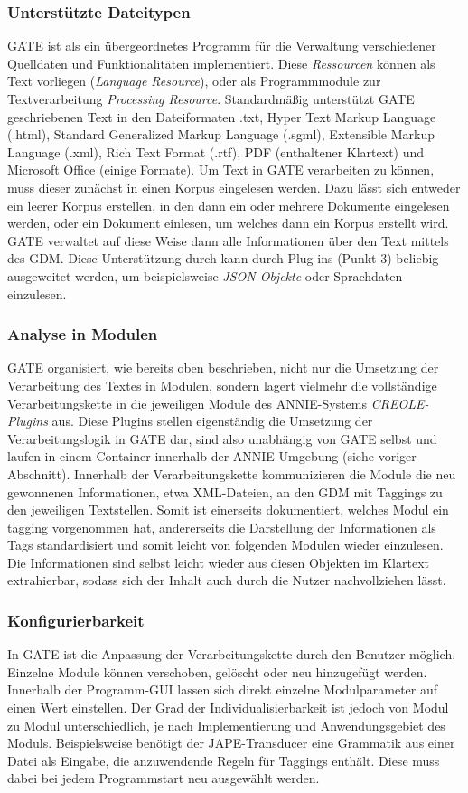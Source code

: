 \documentclass[12pt]{report}
\begin{document}
\subsubsection{Unterstützte Dateitypen}
GATE ist als ein übergeordnetes Programm für die Verwaltung verschiedener Quelldaten und Funktionalitäten implementiert. Diese \textit{Ressourcen} können als Text vorliegen (\textit{Language Resource}), oder als Programmmodule zur Textverarbeitung \textit{Processing Resource}. Standardmäßig unterstützt GATE geschriebenen Text in den Dateiformaten .txt, Hyper Text Markup Language (.html), Standard Generalized Markup Language (.sgml), Extensible Markup Language (.xml), Rich Text Format (.rtf), PDF (enthaltener Klartext) und Microsoft Office (einige Formate). Um Text in GATE verarbeiten zu können, muss dieser zunächst in einen Korpus eingelesen werden. Dazu lässt sich entweder ein leerer Korpus erstellen, in den dann ein oder mehrere Dokumente eingelesen werden, oder ein Dokument einlesen, um welches dann ein Korpus erstellt wird. GATE verwaltet auf diese Weise dann alle Informationen über den Text mittels des GDM. Diese Unterstützung durch kann durch Plug-ins (Punkt 3) beliebig ausgeweitet werden, um beispielsweise \textit{JSON-Objekte} oder Sprachdaten einzulesen.

\subsubsection{Analyse in Modulen}
GATE organisiert, wie bereits oben beschrieben, nicht nur die Umsetzung der Verarbeitung des Textes in Modulen, sondern lagert vielmehr die vollständige Verarbeitungskette in die jeweiligen Module des ANNIE-Systems \textit{CREOLE-Plugins} aus. Diese Plugins stellen eigenständig die Umsetzung der Verarbeitungslogik in GATE dar, sind also unabhängig von GATE selbst und laufen in einem Container innerhalb der ANNIE-Umgebung (siehe voriger Abschnitt). Innerhalb der Verarbeitungskette kommunizieren die Module die neu gewonnenen Informationen, etwa XML-Dateien, an den GDM mit Taggings zu den jeweiligen Textstellen. Somit ist einerseits dokumentiert, welches Modul ein tagging vorgenommen hat,  andererseits die Darstellung der Informationen als Tags standardisiert und somit leicht von folgenden Modulen wieder einzulesen. Die Informationen sind selbst leicht wieder aus diesen Objekten im Klartext extrahierbar, sodass sich der Inhalt auch durch die Nutzer nachvollziehen lässt.

\subsubsection{Konfigurierbarkeit}
In GATE ist die Anpassung der Verarbeitungskette durch den Benutzer möglich. Einzelne Module können verschoben, gelöscht oder neu hinzugefügt werden. Innerhalb der Programm-GUI lassen sich direkt einzelne Modulparameter auf einen Wert einstellen. Der Grad der Individualisierbarkeit ist jedoch von Modul zu Modul unterschiedlich, je nach Implementierung und Anwendungsgebiet des Moduls. Beispielsweise benötigt der JAPE-Transducer eine Grammatik aus einer Datei als Eingabe, die anzuwendende Regeln für Taggings enthält. Diese muss dabei bei jedem Programmstart neu ausgewählt werden.
\end{document}
